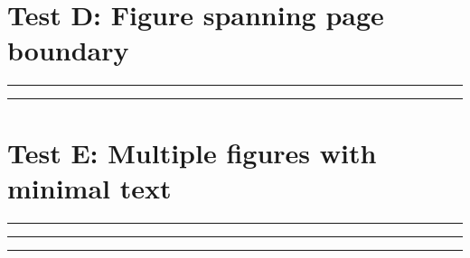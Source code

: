 \documentclass[a4paper,11pt]{article}
\begin{document}
\section*{Test D: Figure spanning page boundary}
\begin{swarmwrap}%
  \begin{minipage}[t]{3cm}
    \centering
    \rule{\linewidth}{10cm}
  \end{minipage}%
\end{swarmwrap}%
\swarmwrapnext
\lipsum[10]
\lipsum[11]
\lipsum[12]
\lipsum[13]
\begin{swarmwrap}%
  \begin{minipage}[t]{2cm}
    \centering
    \rule{\linewidth}{3cm}
  \end{minipage}%
\end{swarmwrap}%
\swarmwrapnext
\lipsum[14]
\lipsum[15]

\section*{Test E: Multiple figures with minimal text}
\begin{swarmwrap}%
  \begin{minipage}[t]{3cm}
    \centering
    \rule{\linewidth}{5cm}
  \end{minipage}%
\end{swarmwrap}%
\swarmwrapnext
\lipsum[16]
\begin{swarmwrap}%
  \begin{minipage}[t]{3cm}
    \centering
    \rule{\linewidth}{5cm}
  \end{minipage}%
\end{swarmwrap}%
\swarmwrapnext
\lipsum[17]
\begin{swarmwrap}%
  \begin{minipage}[t]{3cm}
    \centering
    \rule{\linewidth}{5cm}
  \end{minipage}%
\end{swarmwrap}%
\swarmwrapnext
\lipsum[18]
\end{document}
